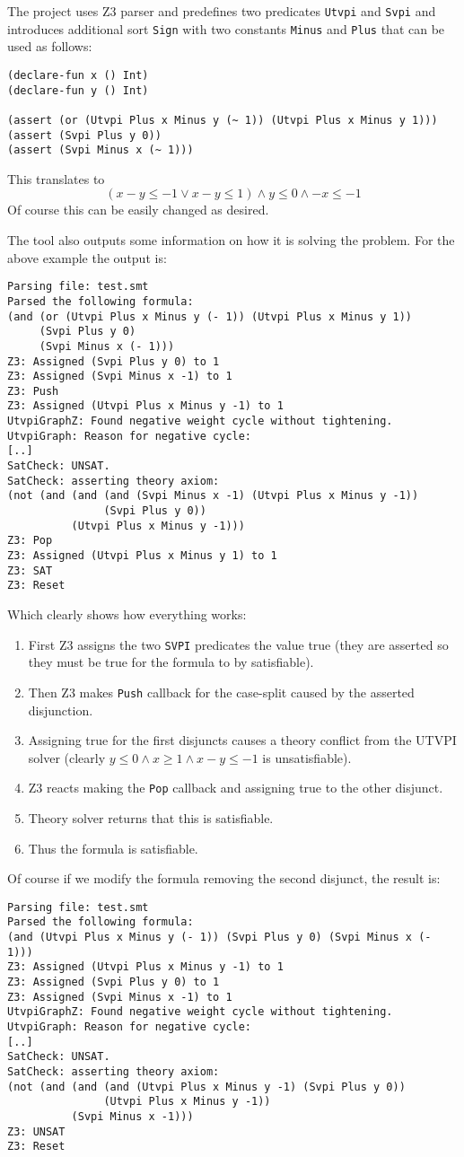 The project uses Z3 parser and predefines two predicates \texttt{Utvpi} and
\texttt{Svpi} and introduces additional sort \texttt{Sign} with two constants
\texttt{Minus} and \texttt{Plus} that can be used as follows:
\begin{verbatim}
(declare-fun x () Int)
(declare-fun y () Int)

(assert (or (Utvpi Plus x Minus y (~ 1)) (Utvpi Plus x Minus y 1)))
(assert (Svpi Plus y 0))
(assert (Svpi Minus x (~ 1)))
\end{verbatim}
This translates to
\[
(x - y \leq -1 \vee x - y \leq 1 )
\land
y \leq 0
\land
- x \leq -1
\]
Of course this can be easily changed as desired.

The tool also outputs some information on how it is solving the problem. For the
above example the output is:
\begin{verbatim}
Parsing file: test.smt
Parsed the following formula:
(and (or (Utvpi Plus x Minus y (- 1)) (Utvpi Plus x Minus y 1))
     (Svpi Plus y 0)
     (Svpi Minus x (- 1)))
Z3: Assigned (Svpi Plus y 0) to 1
Z3: Assigned (Svpi Minus x -1) to 1
Z3: Push
Z3: Assigned (Utvpi Plus x Minus y -1) to 1
UtvpiGraphZ: Found negative weight cycle without tightening.
UtvpiGraph: Reason for negative cycle:
[..]
SatCheck: UNSAT.
SatCheck: asserting theory axiom:
(not (and (and (and (Svpi Minus x -1) (Utvpi Plus x Minus y -1))
               (Svpi Plus y 0))
          (Utvpi Plus x Minus y -1)))
Z3: Pop
Z3: Assigned (Utvpi Plus x Minus y 1) to 1
Z3: SAT
Z3: Reset
\end{verbatim}
Which clearly shows how everything works:
\begin{enumerate}
\item First Z3 assigns the two \texttt{SVPI} predicates the value true (they
  are asserted so they must be true for the formula to by satisfiable).
\item Then Z3 makes \texttt{Push} callback for the case-split caused by the
  asserted disjunction.
\item Assigning true for the first disjuncts causes a theory conflict from the
  UTVPI solver (clearly $y \leq 0 \land x \geq 1 \land x - y \leq -1$ is
  unsatisfiable).
\item Z3 reacts making the \texttt{Pop} callback and assigning true to the other
  disjunct.
\item Theory solver returns that this is satisfiable.
\item Thus the formula is satisfiable.
\end{enumerate}
Of course if we modify the formula removing the second disjunct, the result is:
\begin{verbatim}
Parsing file: test.smt
Parsed the following formula:
(and (Utvpi Plus x Minus y (- 1)) (Svpi Plus y 0) (Svpi Minus x (- 1)))
Z3: Assigned (Utvpi Plus x Minus y -1) to 1
Z3: Assigned (Svpi Plus y 0) to 1
Z3: Assigned (Svpi Minus x -1) to 1
UtvpiGraphZ: Found negative weight cycle without tightening.
UtvpiGraph: Reason for negative cycle:
[..]
SatCheck: UNSAT.
SatCheck: asserting theory axiom:
(not (and (and (and (Utvpi Plus x Minus y -1) (Svpi Plus y 0))
               (Utvpi Plus x Minus y -1))
          (Svpi Minus x -1)))
Z3: UNSAT
Z3: Reset
\end{verbatim}
